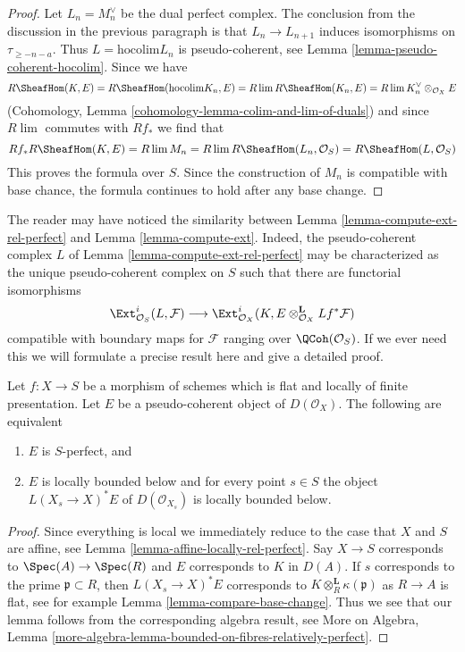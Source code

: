 \begin{proof}
\medskip\noindent
Let $L_n = M_n^\vee$ be the dual perfect complex. The
conclusion from the discussion in the previous paragraph is that
$L_n \to L_{n + 1}$ induces isomorphisms on $\tau_{\geq -n - a}$.
Thus $L = \text{hocolim} L_n$ is pseudo-coherent, see
Lemma \ref{lemma-pseudo-coherent-hocolim}.
Since we have
$$
R\SheafHom(K, E) = R\SheafHom(\text{hocolim} K_n, E) =
R\lim R\SheafHom(K_n, E) = R\lim K_n^\vee \otimes_{\mathcal{O}_X} E
$$
(Cohomology, Lemma \ref{cohomology-lemma-colim-and-lim-of-duals})
and since $R\lim$ commutes with $Rf_*$ we find that
$$
Rf_*R\SheafHom(K, E) = R\lim M_n = R\lim R\SheafHom(L_n, \mathcal{O}_S) =
R\SheafHom(L, \mathcal{O}_S)
$$
This proves the formula over $S$. Since the construction of $M_n$ is
compatible with base chance, the formula continues to hold after
any base change.
\end{proof}

\begin{remark}
\label{remark-compare-L}
The reader may have noticed the similarity between
Lemma \ref{lemma-compute-ext-rel-perfect} and
Lemma \ref{lemma-compute-ext}.
Indeed, the pseudo-coherent complex $L$ of
Lemma \ref{lemma-compute-ext-rel-perfect}
may be characterized as the unique pseudo-coherent complex
on $S$ such that there are functorial isomorphisms
$$
\Ext^i_{\mathcal{O}_S}(L, \mathcal{F}) \longrightarrow
\Ext^i_{\mathcal{O}_X}(K,
E \otimes_{\mathcal{O}_X}^\mathbf{L} Lf^*\mathcal{F})
$$
compatible with boundary maps for $\mathcal{F}$ ranging over
$\QCoh(\mathcal{O}_S)$. If we ever need this we will
formulate a precise result here and give a detailed proof.
\end{remark}

\begin{lemma}
\label{lemma-bounded-on-fibres}
Let $f : X \to S$ be a morphism of schemes which is flat and
locally of finite presentation. Let $E$ be a pseudo-coherent
object of $D(\mathcal{O}_X)$. The following are equivalent
\begin{enumerate}
\item $E$ is $S$-perfect, and
\item $E$ is locally bounded below and for every point $s \in S$
the object $L(X_s \to X)^*E$ of $D(\mathcal{O}_{X_s})$
is locally bounded below.
\end{enumerate}
\end{lemma}

\begin{proof}
Since everything is local we immediately reduce to the
case that $X$ and $S$ are affine, see Lemma
\ref{lemma-affine-locally-rel-perfect}.
Say $X \to S$ corresponds to $\Spec(A) \to \Spec(R)$ and
$E$ corresponds to $K$ in $D(A)$. If $s$ corresponds to
the prime $\mathfrak p \subset R$, then $L(X_s \to X)^*E$
corresponds to $K \otimes_R^\mathbf{L} \kappa(\mathfrak p)$
as $R \to A$ is flat, see for example
Lemma \ref{lemma-compare-base-change}.
Thus we see that our lemma follows from the corresponding algebra
result, see More on Algebra, Lemma
\ref{more-algebra-lemma-bounded-on-fibres-relatively-perfect}.
\end{proof}

